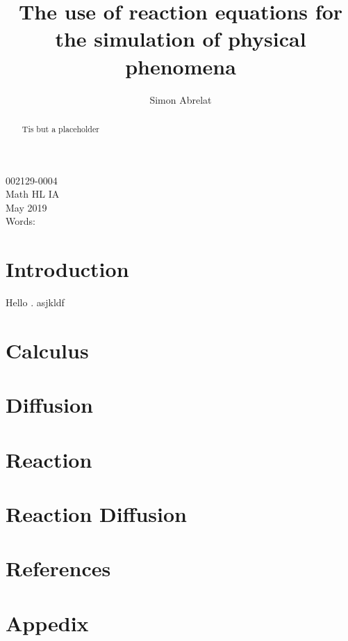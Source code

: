 \documentclass{article}
\title{The use of reaction  equations for the simulation of physical phenomena}
\author{Simon Abrelat}
\date{\vspace{-5ex}}
\begin{document}
\large
{
\fontsize{12}{14.4}
    {
    	\singlespace
    	\maketitle
    	\begin{center}
    	\vspace{4mm}
    	002129-0004 \\
    	\vspace{4mm}
    	Math HL IA \\
    	\vspace{4mm}
   	 May 2019 \\
    	\vspace{4mm}
    	Words: \\
    	\end{center}
    }
}
\newpage

\begin{abstract}
Tis but a placeholder
\end{abstract}

\newpage
\tableofcontents
\newpage 

\section{Introduction}
Hello \cite{knuthwebsite}. \cite{einstein} \cite{latexcompanion}
asjkldf \cite{TEST2}
\section{Calculus}
\section{Diffusion}
\section{Reaction}
\section{Reaction Diffusion}
\section{References}
\newpage
\section{Appedix}

\renewcommand\refname{Bibliography}


 
\end{document}
